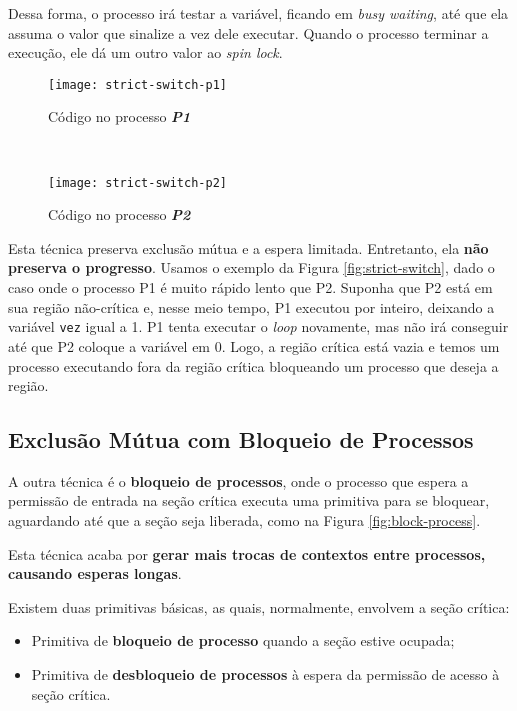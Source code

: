 Dessa forma, o processo irá testar a variável, ficando em \textit{busy waiting}, até que ela assuma o valor que sinalize a vez dele executar. Quando o processo terminar a execução, ele dá um outro valor ao \textit{spin lock}.

\begin{figure*}[ht]
  \begin{subfigure}{0.5\textwidth}
    \centering
    \texttt{[image: strict-switch-p1]}
    \caption{Código no processo \textbf{\textit{P1}}}
  \end{subfigure}
  ~
  \begin{subfigure}{0.5\textwidth}
    \centering
    \texttt{[image: strict-switch-p2]}
    \caption{Código no processo \textbf{\textit{P2}}}
  \end{subfigure}

  \caption{Exemplo clássico de estrita alternância}
  \label{fig:strict-switch}
\end{figure*}

Esta técnica preserva exclusão mútua e a espera limitada. Entretanto, ela \textbf{não preserva o progresso}. Usamos o exemplo da Figura \ref{fig:strict-switch}, dado o caso onde o processo P1 é muito rápido lento que P2. Suponha que P2 está em sua região não-crítica e, nesse meio tempo, P1 executou por inteiro, deixando a variável \texttt{vez} igual a 1. P1 tenta executar o \textit{loop} novamente, mas não irá conseguir até que P2 coloque a variável em 0. Logo, a região crítica está vazia e temos um processo executando fora da região crítica bloqueando um processo que deseja a região.








\subsection{Exclusão Mútua com Bloqueio de Processos}
A outra técnica é o \textbf{bloqueio de processos}, onde o processo que espera a permissão de entrada na seção crítica executa uma primitiva para se bloquear, aguardando até que a seção seja liberada, como na Figura \ref{fig:block-process}.

Esta técnica acaba por \textbf{gerar mais trocas de contextos entre processos, causando esperas longas}.

Existem duas primitivas básicas, as quais, normalmente, envolvem a seção crítica:

\begin{itemize}
  \item Primitiva de \textbf{bloqueio de processo} quando a seção estive ocupada;

  \item Primitiva de \textbf{desbloqueio de processos} à espera da permissão de acesso à seção crítica.
\end{itemize}

